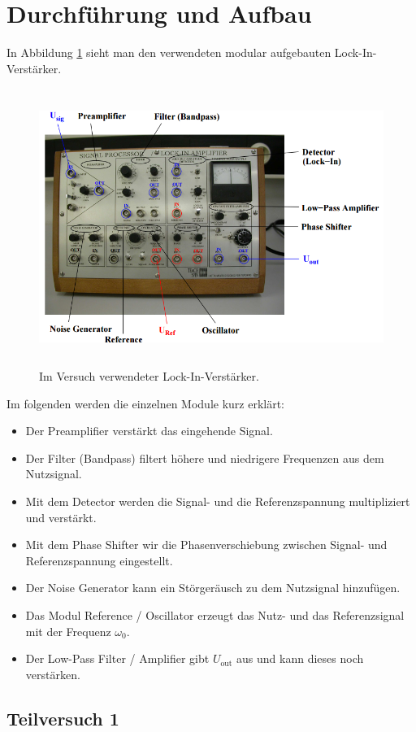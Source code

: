 \section{Durchführung und Aufbau}
\label{sec:Durchführung}

In Abbildung \ref{img:LIV} sieht man den verwendeten modular aufgebauten Lock-In-Verstärker.
\begin{figure}[H]
	\centering
	\includegraphics[height=9cm]{picture/LIV.png}
	\caption{Im Versuch verwendeter Lock-In-Verstärker. \cite[3]{sample}}
  \label{img:LIV}
\end{figure}
Im folgenden werden die einzelnen Module kurz erklärt:
\begin{itemize}
	\item Der Preamplifier verstärkt das eingehende Signal.
	\item Der Filter (Bandpass) filtert höhere und niedrigere Frequenzen aus dem Nutzsignal.
	\item Mit dem Detector werden die Signal- und die Referenzspannung multipliziert und verstärkt.
	\item Mit dem Phase Shifter wir die Phasenverschiebung zwischen Signal- und Referenzspannung eingestellt.
	\item Der Noise Generator kann ein Störgeräusch zu dem Nutzsignal hinzufügen.
	\item Das Modul Reference / Oscillator erzeugt das Nutz- und das Referenzsignal mit der Frequenz $\omega_\text{0}$.
	\item Der Low-Pass Filter / Amplifier gibt $U_\text{out}$ aus und kann dieses noch verstärken.
\end{itemize}
\newpage

\subsection{Teilversuch 1}


